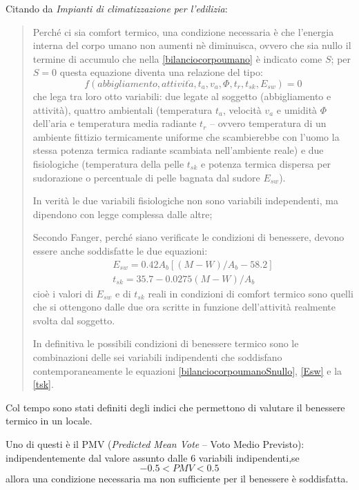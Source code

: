 Citando da \emph{Impianti di climatizzazione per l'edilizia}:
\begin{quote}
	Perché ci sia comfort termico, una condizione necessaria è che l'energia interna del corpo umano non aumenti nè diminuisca, ovvero che sia nullo il termine di accumulo che nella \ref{bilanciocorpoumano} è indicato come $S$; per $S=0$ questa equazione diventa una relazione del tipo:
	\begin{equation}
	\label{bilanciocorpoumanoSnullo}
		f(abbigliamento, attivit\grave{a}, t_a, v_a, \Phi, t_r, t_{sk}, E_{sw})=0
	\end{equation}
	che lega tra loro otto variabili: due legate al soggetto (abbigliamento e attività), quattro ambientali (temperatura $t_a$, velocità $v_a$ e umidità $\Phi$ dell'aria e temperatura media radiante $t_r$ -- ovvero temperatura di un ambiente fittizio termicamente uniforme che scambierebbe con l'uomo la stessa potenza termica radiante scambiata nell'ambiente reale) e due fisiologiche (temperatura della pelle $t_{sk}$ e potenza termica dispersa per sudorazione o percentuale di pelle bagnata dal sudore $E_{sw}$).
	
	In verità le due variabili fisiologiche non sono variabili independenti, ma dipendono con legge complessa dalle altre; 
	
	\sdots
	
	Secondo Fanger, perché siano verificate le condizioni di benessere, devono essere anche soddisfatte le due equazioni:
	\begin{gather}
	\label{Esw}
		E_{sw}=0.42A_b[(M-W)/A_b-58.2]\\
	\label{tsk}
		t_{sk}=35.7-0.0275(M-W)/A_b
	\end{gather}
	cioè i valori di $E_{sw}$ e di $t_{sk}$ reali in condizioni di comfort termico sono quelli che si ottengono dalle due ora scritte in funzione dell'attività realmente svolta dal soggetto.
	
	In definitiva le possibili condizioni di benessere termico sono le combinazioni delle sei variabili indipendenti che soddisfano contemporaneamente le equazioni \ref{bilanciocorpoumanoSnullo}, \ref{Esw} e la \ref{tsk}.
\end{quote}
Col tempo sono stati definiti degli indici che permettono di valutare il benessere termico in un locale. 

Uno di questi è il PMV (\emph{Predicted Mean Vote} -- Voto Medio Previsto): indipendentemente dal valore assunto dalle 6 variabili indipendenti,se 
\begin{equation}
\label{PMV}
	-0.5<PMV<0.5
\end{equation}
allora una condizione necessaria ma non sufficiente per il benessere è soddisfatta.

